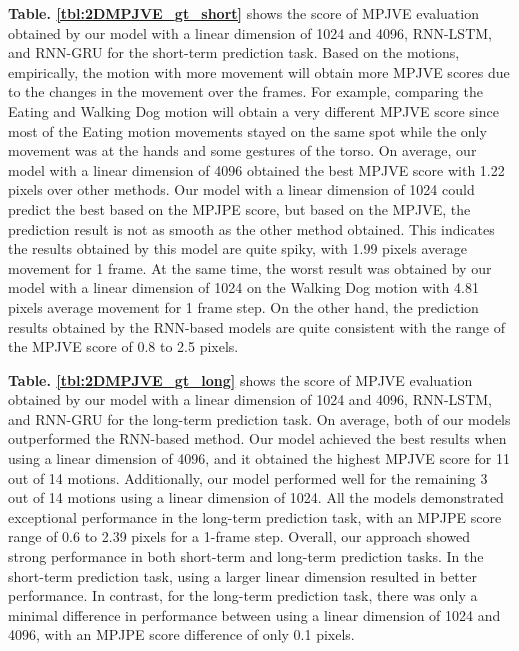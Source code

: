 \textbf{Table. \ref{tbl:2DMPJVE_gt_short}} shows the score of MPJVE evaluation obtained by our model with a linear dimension of 1024 and 4096, RNN-LSTM, and RNN-GRU for the short-term prediction task. Based on the motions, empirically, the motion with more movement will obtain more MPJVE scores due to the changes in the movement over the frames. For example, comparing the Eating and Walking Dog motion will obtain a very different MPJVE score since most of the Eating motion movements stayed on the same spot while the only movement was at the hands and some gestures of the torso. On average, our model with a linear dimension of 4096 obtained the best MPJVE score with 1.22 pixels over other methods. Our model with a linear dimension of 1024 could predict the best based on the MPJPE score, but based on the MPJVE, the prediction result is not as smooth as the other method obtained. This indicates the results obtained by this model are quite spiky, with 1.99 pixels average movement for 1 frame. At the same time, the worst result was obtained by our model with a linear dimension of 1024 on the Walking Dog motion with 4.81 pixels average movement for 1 frame step. On the other hand, the prediction results obtained by the RNN-based models are quite consistent with the range of the MPJVE score of 0.8 to 2.5 pixels. 

\textbf{Table. \ref{tbl:2DMPJVE_gt_long}} shows the score of MPJVE evaluation obtained by our model with a linear dimension of 1024 and 4096, RNN-LSTM, and RNN-GRU for the long-term prediction task. On average, both of our models outperformed the RNN-based method. Our model achieved the best results when using a linear dimension of 4096, and it obtained the highest MPJVE score for 11 out of 14 motions. Additionally, our model performed well for the remaining 3 out of 14 motions using a linear dimension of 1024. All the models demonstrated exceptional performance in the long-term prediction task, with an MPJPE score range of 0.6 to 2.39 pixels for a 1-frame step. Overall, our approach showed strong performance in both short-term and long-term prediction tasks. In the short-term prediction task, using a larger linear dimension resulted in better performance. In contrast, for the long-term prediction task, there was only a minimal difference in performance between using a linear dimension of 1024 and 4096, with an MPJPE score difference of only 0.1 pixels.

